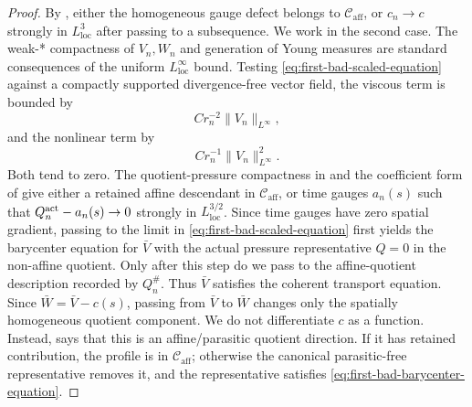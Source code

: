 \documentclass[11pt]{amsart}
\numberwithin{equation}{section}
\theoremstyle{plain}
\theoremstyle{definition}
\theoremstyle{remark}
\newcommand{\loc}{\mathrm{loc}}
\newcommand{\Caff}{\mathcal C_{\mathrm{aff}}}
\begin{document}
\begin{proof}
By , either the homogeneous gauge
defect belongs to \(\Caff\), or \(c_n\to c\) strongly in \(L^3_{\loc}\) after
passing to a subsequence.  We work in the second case.
The weak-* compactness of \(V_n,W_n\) and generation of Young measures are
standard consequences of the uniform \(L^\infty_{\loc}\) bound.  Testing
\eqref{eq:first-bad-scaled-equation} against a compactly supported
divergence-free vector field, the viscous term is bounded by
\[
   Cr_n^{-2}\|V_n\|_{L^\infty},
\]
and the nonlinear term by
\[
   Cr_n^{-1}\|V_n\|_{L^\infty}^2.
\]
Both tend to zero.  The quotient-pressure compactness in
 and the coefficient form of
 give either a retained affine
descendant in \(\Caff\), or time gauges \(a_n(s)\) such that
\(Q_n^{\rm act}-a_n(s)\to0\) strongly in \(L^{3/2}_{\loc}\).  Since time gauges
have zero spatial gradient, passing to the limit in
\eqref{eq:first-bad-scaled-equation} first yields the barycenter equation for
\(\bar V\) with the actual pressure representative \(Q=0\) in the non-affine
quotient.  Only after this step do we pass to the affine-quotient description
recorded by \(Q_n^\#\).  Thus \(\bar V\) satisfies the coherent transport
equation.  Since
\(\bar W=\bar V-c(s)\), passing from \(\bar V\) to \(\bar W\) changes only the
spatially homogeneous quotient component.  We do not differentiate \(c\) as a
function.  Instead,  says that this is
an affine/parasitic quotient direction.  If it has retained contribution, the profile
is in \(\Caff\); otherwise the canonical parasitic-free representative removes
it, and the representative satisfies
\eqref{eq:first-bad-barycenter-equation}.


\end{proof}
\end{document}

